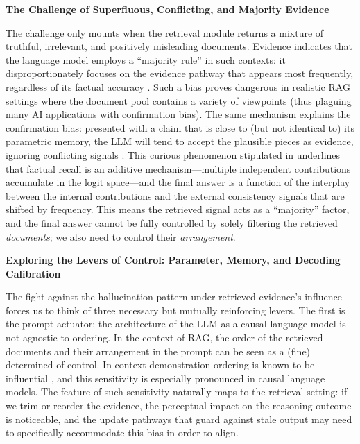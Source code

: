 \documentclass[11pt]{article}
\begin{document}
\textbf{The Challenge of Superfluous, Conflicting, and Majority Evidence}

The challenge only mounts when the retrieval module returns a mixture of truthful, irrelevant, and positively misleading documents. Evidence indicates that the language model employs a ``majority rule'' in such contexts: it disproportionately focuses on the evidence pathway that appears most frequently, regardless of its factual accuracy \cite{ref253}. Such a bias proves dangerous in realistic RAG settings where the document pool contains a variety of viewpoints (thus plaguing many AI applications with confirmation bias). The same mechanism explains the confirmation bias: presented with a claim that is close to (but not identical to) its parametric memory, the LLM will tend to accept the plausible pieces as evidence, ignoring conflicting signals \cite{ref63}. This curious phenomenon stipulated in \cite{ref438} underlines that factual recall is an additive mechanism---multiple independent contributions accumulate in the logit space---and the final answer is a function of the interplay between the internal contributions and the external consistency signals that are shifted by frequency. This means the retrieved signal acts as a ``majority'' factor, and the final answer cannot be fully controlled by solely filtering the retrieved \emph{documents}; we also need to control their \emph{arrangement}.

\textbf{Exploring the Levers of Control: Parameter, Memory, and Decoding Calibration}

The fight against the hallucination pattern under retrieved evidence's influence forces us to think of three necessary but mutually reinforcing levers. The first is the prompt actuator: the architecture of the LLM as a causal language model is not agnostic to ordering. In the context of RAG, the order of the retrieved documents and their arrangement in the prompt can be seen as a (fine) determined of control. In-context demonstration ordering is known to be influential \cite{ref140}, and this sensitivity is especially pronounced in causal language models. The feature of such sensitivity naturally maps to the retrieval setting: if we trim or reorder the evidence, the perceptual impact on the reasoning outcome is noticeable, and the update pathways that guard against stale output may need to specifically accommodate this bias in order to align.
\end{document}

